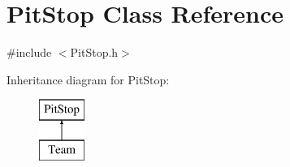 \hypertarget{class_pit_stop}{}\section{Pit\+Stop Class Reference}
\label{class_pit_stop}


{\ttfamily \#include $<$Pit\+Stop.\+h$>$}

Inheritance diagram for Pit\+Stop\+:\begin{figure}[H]
\begin{center}
\leavevmode
\includegraphics[height=2.000000cm]{class_pit_stop}
\end{center}
\end{figure}
